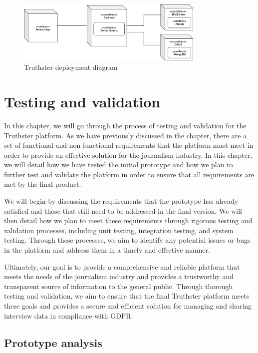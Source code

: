 \documentclass[target=mst,aauheader=]{thud}
\begin{document}
\begin{figure}
    \centering
    \includegraphics[width=0.8\textwidth]{images/deploymentDiagram.png}
    \caption{Truthster deployment diagram}
    \label{fig:deploymentDiagram}
\end{figure}

\chapter{Testing and validation}
\label{chapter:testingValidation}

In this chapter, we will go through the process of testing and validation for the Truthster platform. As we have previously discussed in the  chapter, there are a set of functional and non-functional requirements that the platform must meet in order to provide an effective solution for the journalism industry. In this chapter, we will detail how we have tested the initial prototype and how we plan to further test and validate the platform in order to ensure that all requirements are met by the final product.\par
We will begin by discussing the requirements that the prototype has already satisfied and those that still need to be addressed in the final version. We will then detail how we plan to meet these requirements through rigorous testing and validation processes, including unit testing, integration testing, and system testing. Through these processes, we aim to identify any potential issues or bugs in the platform and address them in a timely and effective manner.\par
Ultimately, our goal is to provide a comprehensive and reliable platform that meets the needs of the journalism industry and provides a trustworthy and transparent source of information to the general public. Through thorough testing and validation, we aim to ensure that the final Truthster platform meets these goals and provides a secure and efficient solution for managing and sharing interview data in compliance with GDPR.

\section{Prototype analysis}
\end{document}
